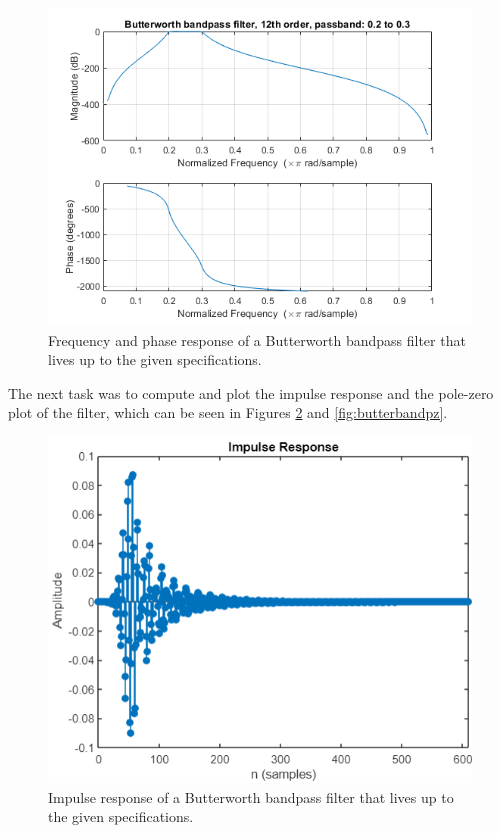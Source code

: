 \documentclass[journal]{IEEEtran}
\begin{document}
\begin{figure} [H]
    \centering
    \includegraphics[width=\linewidth]{assignment_02/plots/butterbandfreq.png}
    \caption{Frequency and phase response of a Butterworth bandpass filter that lives up to the given specifications.}
    \label{fig:butterband}
\end{figure}

The next task was to compute and plot the impulse response and the pole-zero plot of the filter, which can be seen in Figures \ref{fig:butterbandimp} and \ref{fig:butterbandpz}.

\begin{figure} [H]
    \centering
    \includegraphics[width=\linewidth]{assignment_02/plots/1.1_BW_ImpRes.png}
    \caption{Impulse response of a Butterworth bandpass filter that lives up to the given specifications.}
    \label{fig:butterbandimp}
\end{figure}
\end{document}
